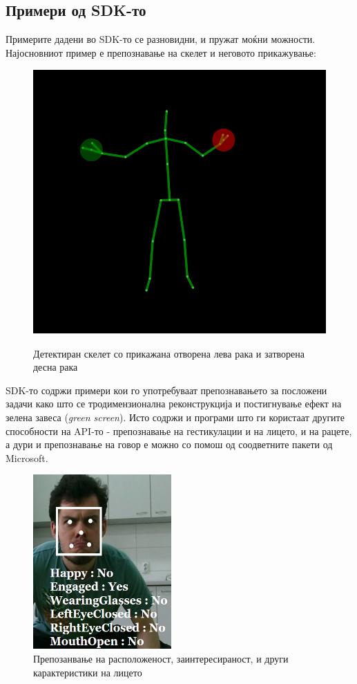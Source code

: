 \documentclass[12pt]{article}
\begin{document}
  \subsection{Примери од SDK-то}
     Примерите дадени во SDK-то се разновидни, и пружат моќни можности. Најосновниот пример е препознавање на скелет и неговото прикажување:
     \begin{figure}[H]
      \centering
      \includegraphics[width = 0.75\linewidth]{./images/shrug_for_windows.png}
      \label{fig:shrug}
      \caption{Детектиран скелет со прикажана отворена лева рака и затворена десна рака}
    \end{figure}

    SDK-то содржи примери кои го употребуваат препознавањето за посложени задачи како што се тродимензионална реконструкција и постигнување ефект на зелена завеса (\textit{green screen}). Исто содржи и програми што ги користаат другите способности на API-то - препознавање на гестикулации и на лицето, и на рацете, а дури и препознавање на говор е можно со помош од соодветните пакети од Microsoft.

    \begin{figure}[H]
      \label{fig:happy_no}
      \centering
      \includegraphics[width = 0.25\linewidth]{./images/happy_no_small.png}
      \caption{Препозанвање на расположеност, заинтересираност, и други карактеристики на лицето}
    \end{figure}
\end{document}
